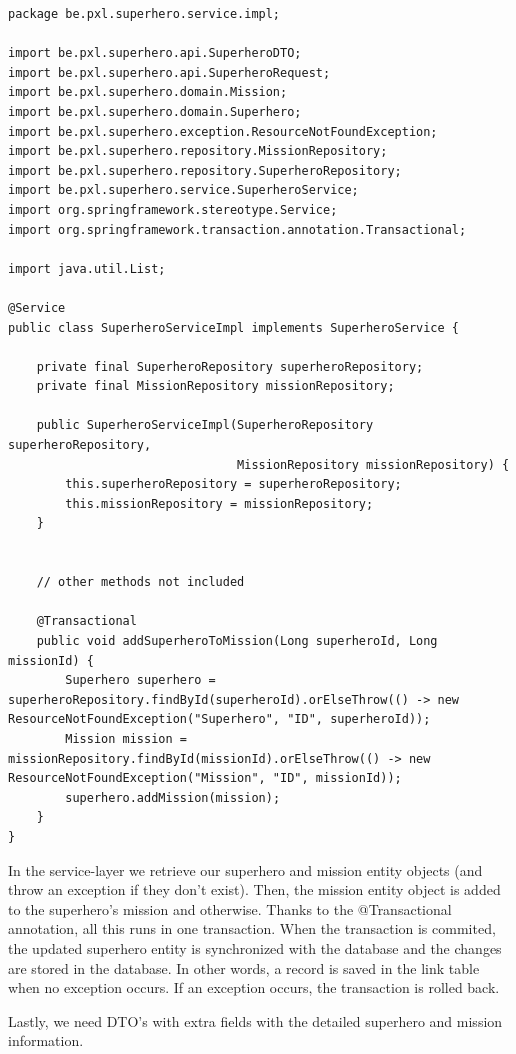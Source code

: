 \begin{lstlisting}
package be.pxl.superhero.service.impl;

import be.pxl.superhero.api.SuperheroDTO;
import be.pxl.superhero.api.SuperheroRequest;
import be.pxl.superhero.domain.Mission;
import be.pxl.superhero.domain.Superhero;
import be.pxl.superhero.exception.ResourceNotFoundException;
import be.pxl.superhero.repository.MissionRepository;
import be.pxl.superhero.repository.SuperheroRepository;
import be.pxl.superhero.service.SuperheroService;
import org.springframework.stereotype.Service;
import org.springframework.transaction.annotation.Transactional;

import java.util.List;

@Service
public class SuperheroServiceImpl implements SuperheroService {

    private final SuperheroRepository superheroRepository;
    private final MissionRepository missionRepository;

    public SuperheroServiceImpl(SuperheroRepository superheroRepository,
                                MissionRepository missionRepository) {
        this.superheroRepository = superheroRepository;
        this.missionRepository = missionRepository;
    }

   
    // other methods not included 

    @Transactional
    public void addSuperheroToMission(Long superheroId, Long missionId) {
        Superhero superhero = superheroRepository.findById(superheroId).orElseThrow(() -> new ResourceNotFoundException("Superhero", "ID", superheroId));
        Mission mission = missionRepository.findById(missionId).orElseThrow(() -> new ResourceNotFoundException("Mission", "ID", missionId));
        superhero.addMission(mission);
    }
}
\end{lstlisting}

In the service-layer we retrieve our superhero and mission entity objects (and throw an exception if they don't exist). Then, the mission entity object is added to the superhero's mission and otherwise. Thanks to the @Transactional annotation, all this runs in one transaction. When the transaction is commited, the updated superhero entity is synchronized with the database and the changes are stored in the database. In other words, a record is saved in the link table when no exception occurs. If an exception occurs, the transaction is rolled back.


Lastly, we need DTO's with extra fields with the detailed superhero and mission information.

